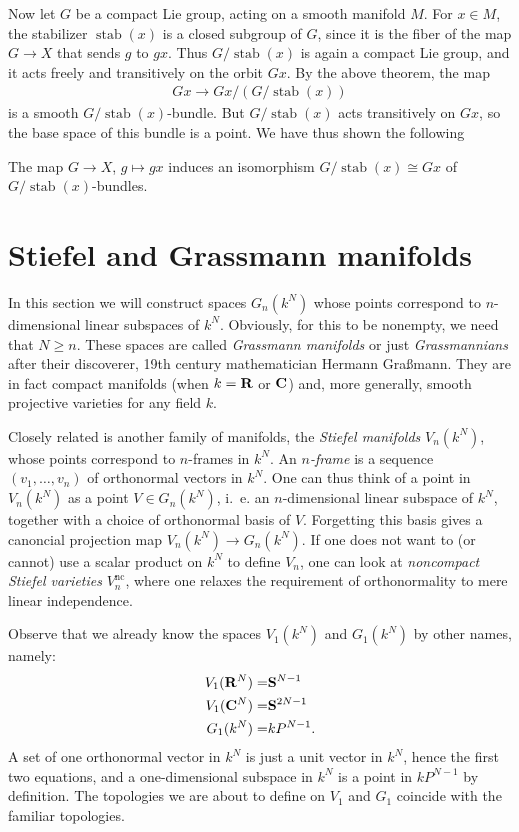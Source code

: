 \documentclass[a4paper,openany]{scrbook}
\DeclareMathOperator{\stab}{stab}
\begin{document}
Now let $G$ be a compact Lie group, acting on a smooth manifold $M$. For $x \in M$, the stabilizer $\stab(x)$ is a closed subgroup of $G$, since it is the fiber of the map $G \to X$ that sends $g$ to $gx$. Thus $G/ \stab(x)$ is again a compact Lie group, and it acts freely and transitively on the orbit $Gx$. By the above theorem, the map
\begin{align*}
Gx \to Gx / (G/\stab(x))
\end{align*}
is a smooth $G/\stab(x)$-bundle. But $G/\stab(x)$ acts transitively on $Gx$, so the base space of this bundle is a point. We have thus shown the following
\begin{corollary}
	The map $G \to X$, $g \mapsto gx$ induces an isomorphism $G/\stab(x) \cong Gx$ of $G/\stab(x)$-bundles.
\end{corollary}	


\section{Stiefel and Grassmann manifolds}

In this section we will construct spaces $G_n(k^N)$ whose points correspond to $n$-dimensional linear subspaces of $k^N$. Obviously, for this to be nonempty, we need that $N \geq n$. These spaces are called \emph{Grassmann manifolds} or just \emph{Grassmannians} after their discoverer, 19th century mathematician Hermann Graßmann. They are in fact compact manifolds (when $k=\mathbf R$ or $\mathbf C$) and, more generally, smooth projective varieties for any field $k$.

Closely related is another family of manifolds, the \emph{Stiefel manifolds} $V_n(k^N)$, whose points correspond to $n$-frames in $k^N$. An \emph{$n$-frame} is a sequence $(v_1,\dots,v_n)$ of orthonormal vectors in $k^N$. One can thus think of a point in $V_n(k^N)$ as a point $V \in G_n(k^N)$, i.~e. an $n$-dimensional linear subspace of $k^N$, together with a choice of orthonormal basis of $V$. Forgetting this basis gives a canoncial projection map $V_n(k^N) \to G_n(k^N)$. If one does not want to (or cannot) use a scalar product on $k^N$ to define $V_n$, one can look at \emph{noncompact Stiefel varieties} $V_n^{\operatorname{nc}}$, where one relaxes the requirement of orthonormality to mere linear independence.

Observe that we already know the spaces $V_1(k^N)$ and $G_1(k^N)$ by other names, namely:
\begin{eqnarray*}
V_1(\mathbf R^{N}) =& \mathbf S^{N-1}\\
V_1(\mathbf C^N) =& \mathbf S^{2N-1}\\
G_1(k^N) =& k P^{N-1}.
\end{eqnarray*}
A set of one orthonormal vector in $k^N$ is just a unit vector in $k^N$, hence the first two equations, and a one-dimensional subspace in $k^N$ is a point in $k P^{N-1}$ by definition. The topologies we are about to define on $V_1$ and $G_1$ coincide with the familiar topologies.
\end{document}
